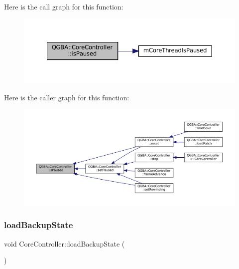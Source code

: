 Here is the call graph for this function\+:
\nopagebreak
\begin{figure}[H]
\begin{center}
\leavevmode
\includegraphics[width=350pt]{class_q_g_b_a_1_1_core_controller_a4b93ae5c212269bbda95efdb07d849e5_cgraph}
\end{center}
\end{figure}
Here is the caller graph for this function\+:
\nopagebreak
\begin{figure}[H]
\begin{center}
\leavevmode
\includegraphics[width=350pt]{class_q_g_b_a_1_1_core_controller_a4b93ae5c212269bbda95efdb07d849e5_icgraph}
\end{center}
\end{figure}
\mbox{\label{class_q_g_b_a_1_1_core_controller_ae3c6183c96ff473cdbdc86132de04ac7}} 
\subsubsection{\texorpdfstring{load\+Backup\+State}{loadBackupState}}
{\footnotesize\ttfamily void Core\+Controller\+::load\+Backup\+State (\begin{DoxyParamCaption}{ }\end{DoxyParamCaption})\hspace{0.3cm}{\ttfamily [slot]}}

